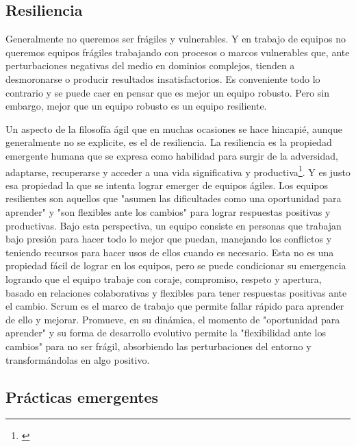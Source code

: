 \subsection{Resiliencia}

Generalmente no queremos ser frágiles y vulnerables. Y en trabajo de equipos no queremos equipos frágiles trabajando con procesos o marcos vulnerables que, ante perturbaciones negativas del medio en dominios complejos, tienden a desmoronarse o producir resultados insatisfactorios. Es conveniente todo lo contrario y se puede caer en pensar que es mejor un equipo robusto. Pero sin embargo, mejor que un equipo robusto es un equipo resiliente. 

Un aspecto de la filosofía ágil que en muchas ocasiones se hace hincapié, aunque generalmente no se explicite, es el de resiliencia. La resiliencia es la propiedad emergente humana que se expresa como habilidad para surgir de la adversidad, adaptarse, recuperarse y acceder a una vida significativa y productiva\footnote{\cite{OPS-OMS-1998}}. Y es justo esa propiedad la que se intenta lograr emerger de equipos ágiles. Los equipos resilientes son aquellos que "asumen las dificultades como una oportunidad para aprender" y "son flexibles ante los cambios" para lograr respuestas positivas y productivas. Bajo esta perspectiva, un equipo consiste en personas que trabajan bajo presión para hacer todo lo mejor que puedan, manejando los conflictos y teniendo recursos para hacer usos de ellos cuando es necesario. Esta no es una propiedad fácil de lograr en los equipos, pero se puede condicionar su emergencia logrando que el equipo trabaje con coraje, compromiso, respeto y apertura, basado en relaciones colaborativas y flexibles para tener respuestas positivas ante el cambio. Scrum es el marco de trabajo que permite fallar rápido para aprender de ello y mejorar. Promueve, en su dinámica, el momento de "oportunidad para aprender" y su forma de desarrollo evolutivo permite la "flexibilidad ante los cambios" para no ser frágil, absorbiendo las perturbaciones del entorno y transformándolas en algo positivo.

\subsection{Prácticas emergentes}

